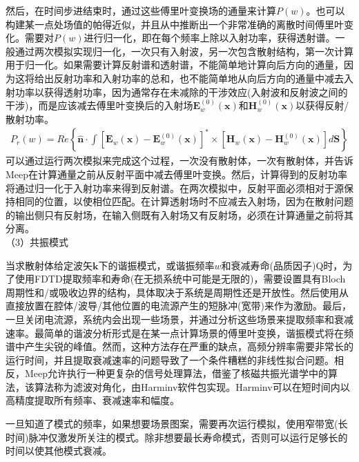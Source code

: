 \documentclass{article}
\numberwithin{equation}{section}
\renewcommand{\vec}[1]{\boldsymbol{#1}}
\begin{document}
然后，在时间步进结束时，通过这些傅里叶变换场的通量来计算$P(w)$。也可以构建某一点处场值的帕得近似，并且从中推断出一个非常准确的离散时间傅里叶变化。需要对$P(w)$进行归一化，即在每个频率上除以入射功率，获得透射谱。一般通过两次模拟实现归一化，一次只有入射波，另一次包含散射结构，第一次计算用于归一化。如果需要计算反射谱和透射谱，不能简单地计算向后方向的通量，因为这将给出反射功率和入射功率的总和，也不能简单地从向后方向的通量中减去入射功率以获得透射功率，因为通常存在未减除的干涉效应(入射波和反射波之间的干涉)，而是应该减去傅里叶变换后的入射场$\mathbf{E}^{(0)}_w(\vec{x})$和$\mathbf{H}^{(0)}_w(\vec{x})$以获得反射/散射功率。
\begin{align}
    P_r(w)=Re\left\{\hat{\vec{n}}\cdot\int\left[\mathbf{E}_w(\vec{x})-\mathbf{E}^{(0)}_w(\vec{x})\right]^*\times\left[\mathbf{H}_w(\vec{x})-\mathbf{H}^{(0)}_w(\vec{x})\right]d\vec{S}\right\}
\end{align}
可以通过运行两次模拟来完成这个过程，一次没有散射体，一次有散射体，并告诉Meep在计算通量之前从反射平面中减去傅里叶变换。然后，计算得到的反射功率将通过归一化于入射功率来得到反射谱。在两次模拟中，反射平面必须相对于源保持相同的位置，以使相位匹配。在计算透射场时不应减去入射场，因为在散射问题的输出侧只有反射场，在输入侧既有入射场又有反射场，必须在计算通量之前将其分离。\\
（3）共振模式\par
当求散射体给定波矢$\vec{k}$下的谐振模式，或谐振频率$w$和衰减寿命(品质因子)Q时，为了使用FDTD提取频率和寿命(在无损系统中可能是无限的)，需要设置具有Bloch周期性和/或吸收边界的结构，具体取决于系统是周期性还是开放性。然后使用从直接放置在腔体/波导/其他位置的电流源产生的短脉冲(宽带)来作为激励。最后，一旦关闭电流源，系统内会出现一些场景，并通过分析这些场景来提取频率和衰减速率。最简单的谐波分析形式是在某一点计算场景的傅里叶变换，谐振模式将在频谱中产生尖锐的峰值。然而，这种方法存在严重的缺点，高频分辨率需要非常长的运行时间，并且提取衰减速率的问题导致了一个条件糟糕的非线性拟合问题。相反，Meep允许执行一种更复杂的信号处理算法，借鉴了核磁共振光谱学中的算法，该算法称为滤波对角化，由Harminv软件包实现。Harminv可以在短时间内以高精度提取所有频率、衰减速率和幅度。



一旦知道了模式的频率，如果想要场景图案，需要再次运行模拟，使用窄带宽(长时间)脉冲仅激发所关注的模式。除非想要最长寿命模式，否则可以运行足够长的时间以使其他模式衰减。
\end{document}
